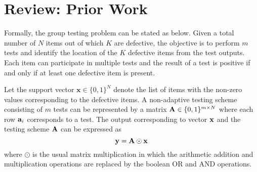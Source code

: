 \documentclass[conference,twocolumn]{IEEEtran}
\begin{document}

\section{Review: Prior Work}
\label{Sec:PriorWork}
Formally, the group testing problem can be stated as below. Given a total number of $N$ items out of which $K$ are defective, the objective is to perform $m$ tests and identify the location of the $K$ defective items from the test outputs. Each item can participate in multiple tests and the result of a test is positive if and only if at least one defective item is present.


Let the support vector $\mathbf{x}\in\{0,1\}^{N}$ denote the list of items with the non-zero values corresponding to the defective items. A non-adaptive testing scheme consisting of $m$ tests can be represented by a matrix $\mathbf{A}\in\{0,1\}^{m\times N}$ where each row $\mathbf{a}_{i}$ corresponds to a test.
The output corresponding to vector $\mathbf{x}$ and the testing scheme $\mathbf{A}$ can be expressed as
\begin{equation*}
\mathbf{y}=\mathbf{A\odot x}
\end{equation*}
where $\odot$ is the usual matrix multiplication in which the arithmetic addition and multiplication operations are replaced by the boolean OR and AND operations.
\end{document}
